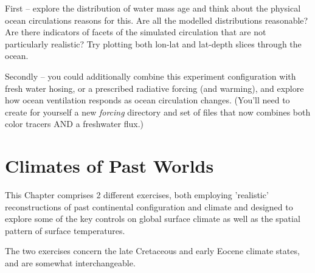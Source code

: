 \documentclass[11pt,fleqn]{book} %
\begin{document}
First -- explore the distribution of water mass age and think about the physical ocean circulations reasons for this. Are all the modelled distributions reasonable? Are there indicators of facets of the simulated circulation that are not particularly realistic? Try plotting both lon-lat and lat-depth slices through the ocean.

Secondly -- you could additionally combine this experiment configuration with fresh water hosing, or a prescribed radiative forcing (and warming), and explore how ocean ventilation responds as ocean circulation changes. (You'll need to create for yourself a new \textit{forcing} directory and set of files that now combines both color tracers AND a freshwater flux.)


\cleardoublepage


\chapter{Climates of Past Worlds}

\hfill \break

\vspace{12mm}

\noindent This Chapter comprises 2 different exercises, both employing 'realistic' reconstructions of past continental configuration and climate and designed to explore some of the key controls on global surface climate as well as the spatial pattern of surface temperatures.

The two exercises concern the late Cretaceous and early Eocene climate states, and are somewhat interchangeable.
\end{document}
